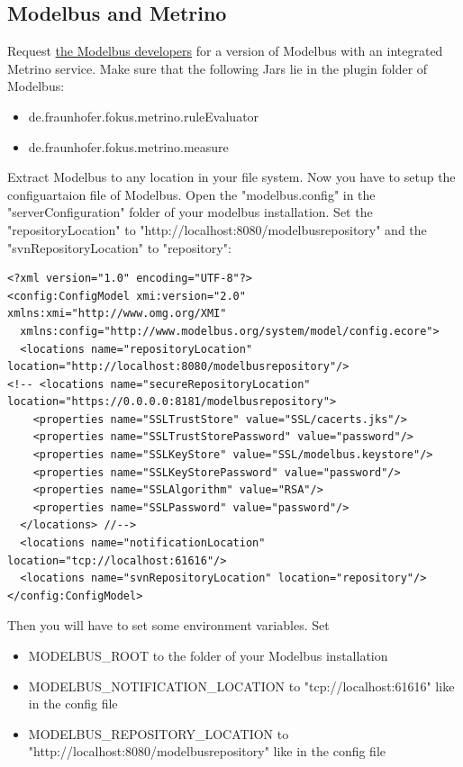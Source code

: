 \subsection{Modelbus and Metrino}
Request \href{http://www.modelbus.org/modelbus/}{the Modelbus developers} for a version of Modelbus with an integrated Metrino service. Make sure that the following Jars lie in the plugin folder of Modelbus:
\begin{itemize}
	\item de.fraunhofer.fokus.metrino.ruleEvaluator
	\item de.fraunhofer.fokus.metrino.measure
\end{itemize}
Extract Modelbus to any location in your file system. Now you have to setup the configuartaion file of Modelbus. Open the "modelbus.config" in the "serverConfiguration" folder of your modelbus installation. Set the "repositoryLocation" to "http://localhost:8080/modelbusrepository" and the "svnRepositoryLocation" to "repository":
\begingroup
    \fontsize{10pt}{12pt}\selectfont
    \begin{verbatim}  
<?xml version="1.0" encoding="UTF-8"?>
<config:ConfigModel xmi:version="2.0" xmlns:xmi="http://www.omg.org/XMI" 
  xmlns:config="http://www.modelbus.org/system/model/config.ecore">
  <locations name="repositoryLocation" location="http://localhost:8080/modelbusrepository"/>
<!-- <locations name="secureRepositoryLocation" location="https://0.0.0.0:8181/modelbusrepository">
    <properties name="SSLTrustStore" value="SSL/cacerts.jks"/>
    <properties name="SSLTrustStorePassword" value="password"/>
    <properties name="SSLKeyStore" value="SSL/modelbus.keystore"/>
    <properties name="SSLKeyStorePassword" value="password"/>
    <properties name="SSLAlgorithm" value="RSA"/>
    <properties name="SSLPassword" value="password"/>
  </locations> //-->
  <locations name="notificationLocation" location="tcp://localhost:61616"/>
  <locations name="svnRepositoryLocation" location="repository"/>
</config:ConfigModel>
    \end{verbatim}  
\endgroup
Then you will have to set some environment variables. Set
\begin{itemize}
	\item MODELBUS\_ROOT to the folder of your Modelbus installation
	\item MODELBUS\_NOTIFICATION\_LOCATION  to "tcp://localhost:61616" like in the config file
	\item MODELBUS\_REPOSITORY\_LOCATION to "http://localhost:8080/modelbusrepository" like in the config file
\end{itemize}



